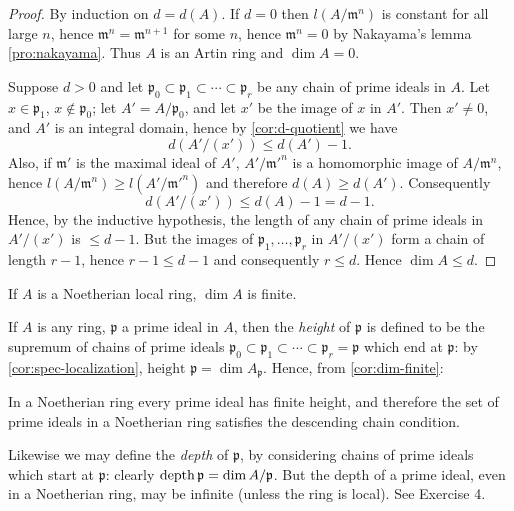 \begin{proof}
By induction on $d = d(A)$. If $d = 0$ then $l(A/\mathfrak{m}^n)$ is constant for all large $n$, hence $\mathfrak{m}^n = \mathfrak{m}^{n+1}$ for some $n$, hence $\mathfrak{m}^n = 0$ by Nakayama's lemma \eqref{pro:nakayama}. Thus $A$ is an Artin ring and $\dim A = 0$.

Suppose $d > 0$ and let $\mathfrak{p}_0 \subset \mathfrak{p}_1 \subset \cdots \subset \mathfrak{p}_r$ be any chain of prime ideals in $A$. Let $x \in \mathfrak{p}_1$, $x \notin \mathfrak{p}_0$; let $A' = A/\mathfrak{p}_0$, and let $x'$ be the image of $x$ in $A'$. Then $x' \neq 0$, and $A'$ is an integral domain, hence by \eqref{cor:d-quotient} we have
\[
    d(A'/(x')) \leq d(A') - 1.
\]
Also, if $\mathfrak{m}'$ is the maximal ideal of $A'$, $A'/\mathfrak{m}'^n$ is a homomorphic image of $A/\mathfrak{m}^n$, hence $l(A/\mathfrak{m}^n) \geq l(A'/\mathfrak{m}'^n)$ and therefore $d(A) \geq d(A')$. Consequently
\[
    d(A'/(x')) \leq d(A) - 1 = d - 1.
\]
Hence, by the inductive hypothesis, the length of any chain of prime ideals in $A'/(x')$ is $\leq d - 1$. But the images of $\mathfrak{p}_1, \ldots, \mathfrak{p}_r$ in $A'/(x')$ form a chain of length $r - 1$, hence $r - 1 \leq d - 1$ and consequently $r \leq d$. Hence $\dim A \leq d$.
\end{proof}

\begin{corollary}\label{cor:dim-finite}
If $A$ is a Noetherian local ring, $\dim A$ is finite.
\end{corollary}

If $A$ is any ring, $\mathfrak{p}$ a prime ideal in $A$, then the \emph{height} of $\mathfrak{p}$ is defined to be the supremum of chains of prime ideals $\mathfrak{p}_0 \subset \mathfrak{p}_1 \subset \cdots \subset \mathfrak{p}_r = \mathfrak{p}$ which end at $\mathfrak{p}$: by \eqref{cor:spec-localization}, $\text{height } \mathfrak{p} = \dim A_{\mathfrak{p}}$. Hence, from \eqref{cor:dim-finite}:

\begin{corollary}\label{cor:finite-height}
In a Noetherian ring every prime ideal has finite height, and therefore the set of prime ideals in a Noetherian ring satisfies the descending chain condition.
\end{corollary}

\begin{remark}
Likewise we may define the \emph{depth} of $\mathfrak{p}$, by considering chains of prime ideals which start at $\mathfrak{p}$: clearly $\operatorname{depth} \mathfrak{p} = \dim A/\mathfrak{p}$. But the depth of a prime ideal, even in a Noetherian ring, may be infinite (unless the ring is local). See Exercise 4.
\end{remark}

